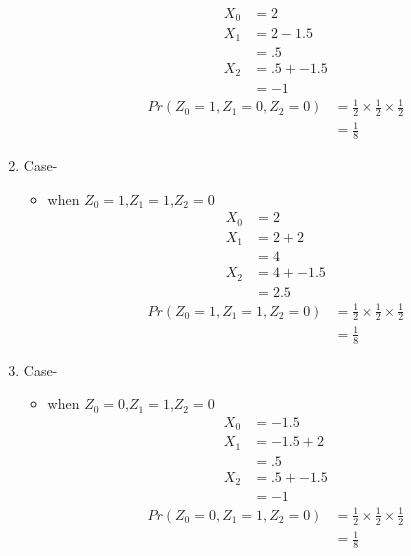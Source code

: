 \documentclass[11pt,a4paper,twocolumn]{article}
\begin{document}
\begin{enumerate}
\begin{itemize}
        \begin{align*}
            X_{0}&=2\\
            X_{1}&=2-1.5\\
            &=.5\\
            X_{2}&=.5+-1.5\\
            &=-1
        \end{align*}
        \begin{align*}
            Pr(Z_{0}=1,Z_{1}=0,Z_{2}=0)&=\frac{1}{2}\times\frac{1}{2}\times\frac{1}{2}\\
            &=\frac{1}{8}
        \end{align*}
    \end{itemize}
    \item Case-
    \begin{itemize}
        \item when $Z_{0}=1$,$Z_{1}=1$,$Z_{2}=0$\\
        \begin{align*}
            X_{0}&=2\\
            X_{1}&=2+2\\
            &=4\\
            X_{2}&=4+-1.5\\
            &=2.5
        \end{align*}
        \begin{align*}
            Pr(Z_{0}=1,Z_{1}=1,Z_{2}=0)&=\frac{1}{2}\times\frac{1}{2}\times\frac{1}{2}\\
            &=\frac{1}{8}
        \end{align*}
    \end{itemize}
    \item Case-
    \begin{itemize}
        \item when $Z_{0}=0$,$Z_{1}=1$,$Z_{2}=0$\\
        \begin{align*}
            X_{0}&=-1.5\\
            X_{1}&=-1.5+2\\
            &=.5\\
            X_{2}&=.5+-1.5\\
            &=-1
        \end{align*}
        \begin{align*}
            Pr(Z_{0}=0,Z_{1}=1,Z_{2}=0)&=\frac{1}{2}\times\frac{1}{2}\times\frac{1}{2}\\
            &=\frac{1}{8}
        \end{align*}
    \end{itemize}
\end{enumerate}
\end{document}

